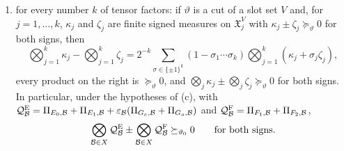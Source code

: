 \begin{lemma}[Polarization]
\begin{enumerate}[label=\textup{(\alph*)}]
\[  \pm\Bigl(\bigotimes_{\Blk}\Pi_{F_1,\Blk}+\bigotimes_{\Blk}\Pi_{F_2,\Blk}\Bigr)
  \succeq_{\vartheta_0}0,
 \]
 and $\bigotimes_{\Blk}\bigl(\Pi_{E_0,\Blk}+\Pi_{E_1,\Blk}+\varepsilon_{\Blk}
 (\Pi_{G_e,\Blk}+\Pi_{G_o,\Blk})\bigr)\succeq_{\vartheta_0}
 \bigotimes_{\Blk}\Pi_{F_1,\Blk}+\bigotimes_{\Blk}\Pi_{F_2,\Blk}$;
\item for every number $k$ of tensor factors: if $\vartheta$ is a
 cut of a slot set $V$ and, for
 $j=1,\dots,k$, $\kappa_j$ and $\zeta_j$ are finite signed measures on
 $\mathfrak X_j^V$ with $\kappa_j\pm\zeta_j\succeq_\vartheta0$ for both signs, then
 \[
  \bigotimes_{j=1}^k\kappa_j-\bigotimes_{j=1}^k\zeta_j
  =2^{-k}\sum_{\sigma\in\{\pm1\}^k}(1-\sigma_1\cdots\sigma_k)
  \bigotimes_{j=1}^k(\kappa_j+\sigma_j\zeta_j),
 \]
 every product on the right is $\succeq_\vartheta0$, and
 $\bigotimes_j\kappa_j\pm\bigotimes_j\zeta_j\succeq_\vartheta0$ for both signs. In
 particular, under the hypotheses of (c), with
 $\mathcal Q^{\rm E}_\mathcal B=\Pi_{E_0,\mathcal B}+\Pi_{E_1,\mathcal B}
 +\varepsilon_\mathcal B(\Pi_{G_e,\mathcal B}+\Pi_{G_o,\mathcal B})$ and
 $\mathcal Q^{\rm F}_\mathcal B=\Pi_{F_1,\mathcal B}+\Pi_{F_2,\mathcal B}$,
 \[
  \bigotimes_{\mathcal B\in X}\mathcal Q^{\rm E}_\mathcal B\pm\bigotimes_{\mathcal B\in X}\mathcal Q^{\rm F}_\mathcal B
  \succeq_{\vartheta_0}0\qquad\text{for both signs.}
 \]
\end{enumerate}
\end{lemma}

